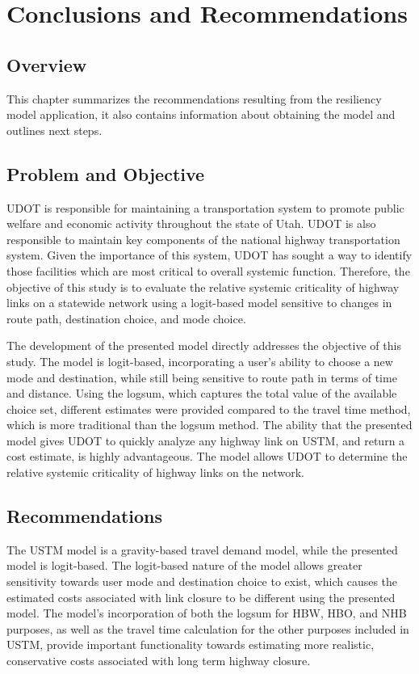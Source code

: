 \chapter{Conclusions and Recommendations}
\label{chp:chapter5}
\graphicspath{{figures/}{figures/chapter5/}}

\section{Overview}

This chapter summarizes the recommendations resulting from the resiliency
model application, it also contains information about obtaining the model and
outlines next steps.

\section{Problem and Objective}

UDOT is responsible for maintaining a
transportation system to promote public welfare and economic activity throughout
the state of Utah. UDOT is also responsible to maintain key components of the
national highway transportation system. Given the importance of this system,
UDOT has sought a way to identify those facilities which are most critical to
overall systemic function. Therefore, the objective of this study is to evaluate the relative systemic
criticality of highway links on a statewide network using a logit-based model
sensitive to changes in route path, destination choice, and mode choice.

The development of the presented model directly addresses the objective of
this study. The model is logit-based, incorporating a user's
ability to choose a new mode and destination, while still being sensitive to route
path in terms of time and distance. Using the logsum, which captures the total
value of the available choice set, different estimates were provided compared to
the travel time method, which is more traditional than the logsum method. The ability that the
presented model gives UDOT to quickly analyze any highway link on USTM, and return a
cost estimate, is highly advantageous. The model allows UDOT to determine
the relative systemic criticality of highway links on the network.

\section{Recommendations}

The USTM model is a gravity-based travel demand model, while the presented model
is logit-based. The logit-based nature of the model allows
greater sensitivity towards user mode and destination choice to exist, which causes
the estimated costs associated with link closure to be different using the presented model.
The model's incorporation of both the logsum for HBW, HBO, and NHB purposes, as
well as the travel time calculation for the other purposes included in USTM,
provide important functionality towards estimating more realistic, conservative costs
associated with long term highway closure.

